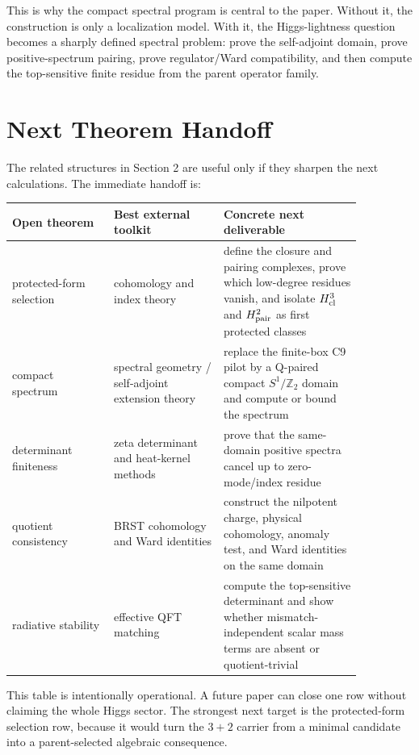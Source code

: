 \documentclass[11pt]{article}
\begin{document}
This is why the compact spectral program is central to the paper.  Without it,
the construction is only a localization model.  With it, the Higgs-lightness
question becomes a sharply defined spectral problem: prove the self-adjoint
domain, prove positive-spectrum pairing, prove regulator/Ward compatibility,
and then compute the top-sensitive finite residue from the parent operator
family.

\section{Next Theorem Handoff}
The related structures in Section 2 are useful only if they sharpen the next
calculations.  The immediate handoff is:

\begin{center}
\begin{tabular}{p{0.25\linewidth}p{0.27\linewidth}p{0.34\linewidth}}
\toprule
\textbf{Open theorem} & \textbf{Best external toolkit} & \textbf{Concrete next deliverable}\\
\midrule
protected-form selection & cohomology and index theory & define the closure
and pairing complexes, prove which low-degree residues vanish, and isolate
$H^3_{\rm cl}$ and $H^2_{\rm pair}$ as first protected classes\\
compact spectrum & spectral geometry / self-adjoint extension theory & replace
the finite-box C9 pilot by a Q-paired compact $S^1/\mathbb Z_2$ domain and
compute or bound the spectrum\\
determinant finiteness & zeta determinant and heat-kernel methods & prove that
the same-domain positive spectra cancel up to zero-mode/index residue\\
quotient consistency & BRST cohomology and Ward identities & construct the
nilpotent charge, physical cohomology, anomaly test, and Ward identities on the
same domain\\
radiative stability & effective QFT matching & compute the top-sensitive
determinant and show whether mismatch-independent scalar mass terms are absent
or quotient-trivial\\
\bottomrule
\end{tabular}
\end{center}

This table is intentionally operational.  A future paper can close one row
without claiming the whole Higgs sector.  The strongest next target is the
protected-form selection row, because it would turn the $3+2$ carrier from a
minimal candidate into a parent-selected algebraic consequence.
\end{document}
